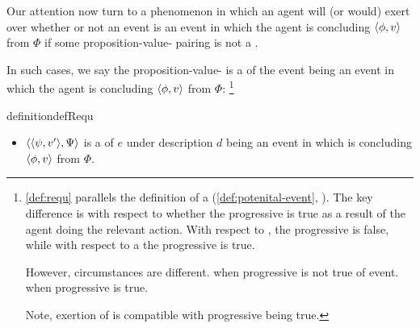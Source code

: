 \begin{note}
  Our attention now turn to a phenomenon in which an agent will (or would) exert \ninf{} over whether or not an event is an event in which the agent is concluding \(\langle \phi, v \rangle\) from \(\Phi\) if some proposition-value-\poP{} pairing is not a \fc{}.

  In such cases, we say the proposition-value-\poP{} is a \requ{} of the event being an event in which the agent is concluding \(\langle \phi, v \rangle\) from \(\Phi\):%
  \footnote{
    \autoref{def:requ} parallels the definition of a \pevent{} (\autoref{def:potenital-event}, ).
    The key difference is with respect to whether the progressive is true as a result of the agent doing the relevant action.
    With respect to \ninf{}, the progressive is false, while with respect to a  the progressive is true.

    However, circumstances are different.
    \pevent{} when progressive is not true of event.
    \ninf{} when progressive is true.

    Note, exertion of \ninf{} is compatible with progressive being true.
  }

  \begin{restatable}[A \requ{0}]{definition}{defRequ}
    \label{def:requ}


    \begin{itemize}
    \item
      \(\langle \langle \psi, v' \rangle, \Psi \rangle\) is a \emph{\requ{}} of \(e\) under description \(d\) being an event in which \vAgent{} is concluding \(\langle \phi, v \rangle\) from \(\Phi\).
    \end{itemize}


\end{restatable}
\end{note}
